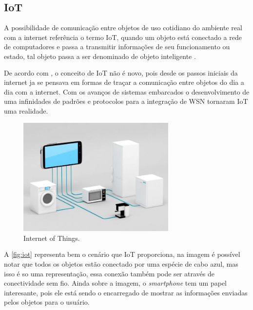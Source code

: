     

    \subsection{IoT}
    \par
    A possibilidade de comunicação entre objetos de uso cotidiano do ambiente real com a internet referência o termo IoT, quando um objeto está conectado a rede de computadores e passa a transmitir informações de seu funcionamento ou estado, tal objeto passa a ser denominado de objeto inteligente \cite{iot2016}.
    \par
    De acordo com \citeauthor{iot2017}, o conceito de IoT não é novo, pois desde os passos iniciais da internet ja se pensava em formas de traçar a comunicação entre objetos do dia a dia com a internet. Com os avanços de sistemas embarcados o desenvolvimento de uma infinidades de padrões e protocolos para a integração de WSN tornaram IoT uma realidade.
    \begin{figure}[H]
              \caption{\label{fig:iot}{Internet of Things.}}
              \centering
              \includegraphics[width=0.7\textwidth]{Figuras/iot.png}
        \end{figure}
    \par
    A \autoref{fig:iot} representa bem o cenário que IoT proporciona, na imagem é possível notar que todos os objetos estão conectado por uma espécie de cabo azul, mas isso é so uma representação, essa conexão também pode ser através de conectividade sem fio. Ainda sobre a imagem, o \textit{smartphone} tem um papel interesante, pois ele está sendo o encarregado de mostrar as informações enviadas pelos objetos para o usuário.
    
